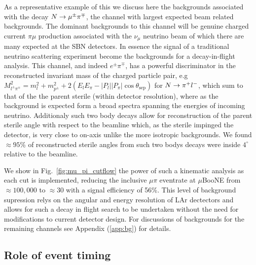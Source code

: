 \documentclass[11pt, a4paper]{article}
\newcommand{\reffig}[1]{Fig.~\ref{#1}}
\def\ster{\ensuremath N}
\begin{document}
As a representative example of this we discuss here the backgrounds associated with the decay $\ster \rightarrow \mu^\pm \pi^\mp$, the channel with largest expected beam related backgrounds. The dominant backgrounds to this channel will be genuine charged current $\pi \mu$ production associated with the $\nu_\mu$ neutrino beam of which there are many expected at the SBN detectors. In essence the signal of a traditional neutrino scattering experiment become the backgrounds for a decay-in-flight analysis. 
This channel, and indeed $e^\pm \pi^\mp$, has a powerful discriminator in
the reconstructed invariant mass of the charged particle pair, e.g  $M_{l^\pm
\pi^\mp}^2=m_l^2+m_{p^\pm}^2+ 2(E_l E_\pi - |P_l||P_\pi|\cos\theta_\text{sep})$
for $\ster\rightarrow \pi^+ l^-$, which sum to that of the the parent sterile
(within detector resolution), where as the background is expected form a broad
spectra spanning the energies of incoming neutrino. Additionaly such two body
decays allow for reconstruction of the parent sterile angle with respect to the
beamline which, as the sterile impinged the detector, is very close to on-axis unlike the more isotropic
backgrounds. We found $\approx 95$\% of reconstructed sterile angles from such two bodys
decays were inside $4^\circ$ relative to the beamline. 

We show in \reffig{fig:mu_pi_cutflow} the power of such a kinematic analysis as each cut is implemented, reducing the inclusive $\mu \pi$ eventrate at $\mu$BooNE from $\approx 100,000$ to $\approx 30$ with a signal efficiency of 56\%. This level of background supression relys on the angular and energy resolution of LAr dectectors and allows for such a decay in flight search to be undertaken without the need for modifications to current detector design.
For discussions of backgrounds for the remaining channels see Appendix (\ref{app:bg}) for details.

\subsection{\label{sec:timing}Role of event timing}
\end{document}
